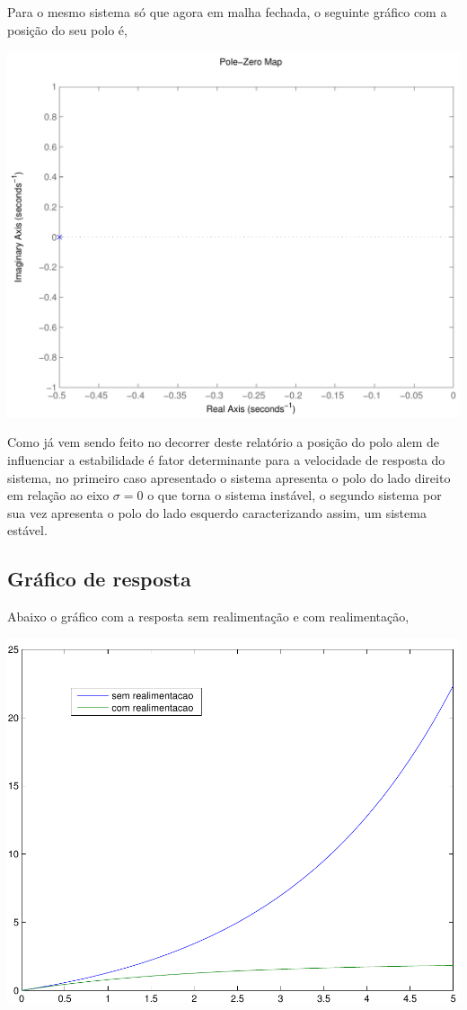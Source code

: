\documentclass[paper=a4, fontsize=11pt]{article}
\begin{document}
Para o mesmo sistema só que agora em malha fechada, o seguinte gráfico com a posição
do seu polo é,

\begin{center}
    \includegraphics[scale=0.5]{q5iamb.pdf}
\end{center}

Como já vem sendo feito no decorrer deste relatório a posição do polo alem de influenciar
a estabilidade é fator determinante para a velocidade de resposta do sistema, no primeiro
caso apresentado o sistema apresenta o polo do lado direito em relação ao eixo $\sigma=0$
o que torna o sistema instável, o segundo sistema por sua vez apresenta o polo do lado 
esquerdo caracterizando assim, um sistema estável.

\subsection{Gráfico de resposta}

Abaixo o gráfico com a resposta sem realimentação e com realimentação,

\begin{center}
    \includegraphics[scale=0.5]{q5g.pdf}
\end{center}
\end{document}

